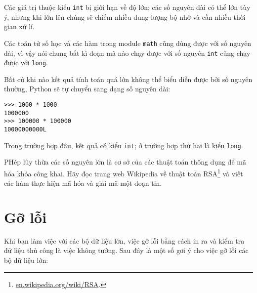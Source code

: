 \documentclass[11pt]{book}
\begin{document}

Các giá trị thuộc kiểu {\tt int} bị giới hạn về độ lớn;
các số nguyên dài có thể lớn tùy ý, nhưng khi lớn lên chúng sẽ
chiếm nhiều dung lượng bộ nhớ và cần nhiều thời gian xử lí.

Các toán tử số học và các hàm trong module {\tt math} cũng
dùng được với số nguyên dài, vì vậy nói chung bất kì đoạn mã
nào chạy được với số nguyên {\tt int} cũng chạy được với {\tt long}.

Bất cứ khi nào kết quả tính toán quá lớn không thể biểu diễn được bởi số
nguyên thường, Python sẽ tự chuyển sang dạng số nguyên dài:

\beforeverb
\begin{verbatim}
>>> 1000 * 1000
1000000
>>> 100000 * 100000
10000000000L
\end{verbatim}
\afterverb
%
Trong trường hợp đầu, kết quả có kiểu {\tt int}; ở trường hợp thứ hai
là kiểu {\tt long}.

\begin{ex}


PHép lũy thừa các số nguyên lớn là cơ sở của các thuật toán thông dụng
để mã hóa khóa công khai. Hãy đọc trang web Wikipedia
về thuật toán RSA\footnote{\url{en.wikipedia.org/wiki/RSA}.}
và viết các hàm thực hiện mã hóa và giải mã một đoạn tin.

\end{ex}


\section{Gỡ lỗi}

Khi bạn làm việc với các bộ dữ liệu lớn, việc gỡ lỗi bằng cách 
in ra và kiểm tra dữ liệu thủ công là việc không tưởng. Sau đây
là một số gơi ý cho việc gỡ lỗi các bộ dữ liệu lớn:
\end{document}
